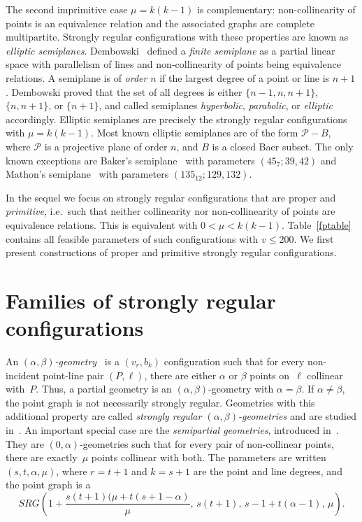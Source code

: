 \documentclass[12pt, reqno]{amsart}
\def\P{\mathcal{P}}
\begin{document}
The second imprimitive case $\mu=k(k-1)$ is complementary: non-collinearity of points
is an equivalence relation and the associated graphs are complete multipartite. Strongly
regular configurations with these properties are known as \emph{elliptic semiplanes}.
Dembowski~\cite{PD68} defined a \emph{finite semiplane} as a partial
linear space with parallelism of lines and non-collinearity of
points being equivalence relations. A semiplane is of \emph{order} $n$
if the largest degree of a point or line is $n+1$. Dembowski proved
that the set of all degrees is either $\{n-1,n,n+1\}$, $\{n,n+1\}$,
or $\{n+1\}$, and called semiplanes \emph{hyperbolic},
\emph{parabolic}, or \emph{elliptic} accordingly.
Elliptic semiplanes are precisely the strongly regular configurations with $\mu=k(k-1)$.
Most known elliptic semiplanes are of the form $\mathcal{P}-B$, where $\P$ is a
projective plane of order $n$, and $B$ is a closed Baer subset. The
only known exceptions are Baker's semiplane~\cite{RDB78} with parameters
$(45_7;39,42)$ and Mathon's semiplane~\cite{RM07} with
parameters $(135_{12};129,132)$.

In the sequel we focus on strongly regular configurations that are
proper and \emph{primitive}, i.e.\ such that neither collinearity nor
non-col\-li\-ne\-arity of points are equivalence relations. This is equivalent
with $0< \mu < k(k-1)$. Table~\ref{fptable} contains all feasible parameters
of such configurations with $v\le 200$. We first present constructions of proper
and primitive strongly regular configurations.


\section{Families of strongly regular configurations}\label{sec3}

An \emph{$(\alpha,\beta)$-geometry}~\cite{DV94} is a $(v_r,b_k)$ configuration such that
for every non-incident point-line pair $(P,\ell)$, there are
either $\alpha$ or $\beta$ points on~$\ell$ collinear with~$P$.
Thus, a partial geometry is an $(\alpha,\beta)$-geometry with $\alpha=\beta$.
If $\alpha\neq \beta$, the point graph is not necessarily
strongly regular. Geometries with this additional property are called
\emph{strongly regular $(\alpha,\beta)$-geometries} and are studied in~\cite{HM01}.
An important special case are the \emph{semipartial geometries}, introduced in~\cite{DT78}.
They are $(0,\alpha)$-geometries such that for every pair of non-collinear points, there
are exactly~$\mu$ points collinear with both. The parameters are written $(s,t,\alpha,\mu)$,
where $r=t+1$ and $k=s+1$ are the point and line degrees, and the point graph is a
$$SRG\left(1+\frac{s(t+1)(\mu+t(s+1-\alpha)}{\mu},\,s(t+1),\,s-1+t(\alpha-1),\,\mu\right).$$
\end{document}
